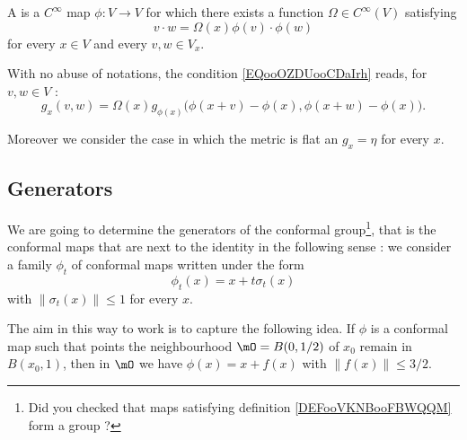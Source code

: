 \begin{definition}      \label{DEFooVKNBooFBWQQM}
    A  is a \(  C^{\infty}\) map \( \phi\colon V\to V\) for which there exists a function \( \Omega\in C^{\infty}(V)\) satisfying
    \begin{equation}        \label{EQooOZDUooCDaIrh}
        v\cdot w=\Omega(x) \phi(v)\cdot \phi(w)
    \end{equation}
    for every \( x\in V\) and every \( v,w\in V_x\).
\end{definition}
With no abuse of notations, the condition \eqref{EQooOZDUooCDaIrh} reads, for \( v,w\in V\) :
\begin{equation}
    g_x(v,w)=\Omega(x)g_{\phi(x)}\big(  \phi(x+v)-\phi(x),\phi(x+w)-\phi(x)  \big).
\end{equation}

Moreover we consider the case in which the metric is flat an \( g_x=\eta\) for every \( x\).

\subsection{Generators}

We are going to determine the generators of the conformal group\footnote{Did you checked that maps satisfying definition \ref{DEFooVKNBooFBWQQM} form a group ?}, that is the conformal maps that are next to the identity in the following sense : we consider a family \( \phi_t\) of conformal maps written under the form
\begin{equation}
    \phi_t(x)=x+t\sigma_t(x)
\end{equation}
with \( \| \sigma_t(x) \|\leq 1  \) for every \( x\).

The aim in this way to work is to capture the following idea. If \( \phi\) is a conformal map such that points the neighbourhood \(  \mO=B(0,1/2)  \) of \( x_0\) remain in \( B(x_0,1)\), then in \( \mO\) we have \( \phi(x)=x+f(x)\) with \( \| f(x) \|\leq 3/2\).

